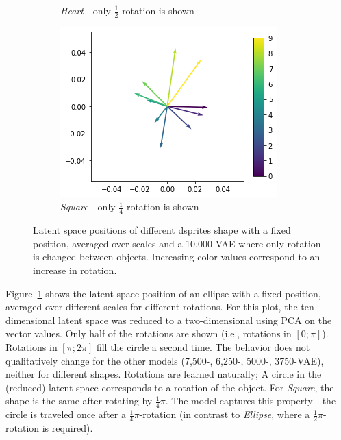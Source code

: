 \begin{figure}
\begin{subfigure}{.3\textwidth}
        \caption{\textit{Heart} - only $\frac{1}{2}$ rotation is shown}
    \end{subfigure}
    \hfill
    \begin{subfigure}{.3\textwidth}
        \includegraphics[width=\textwidth]{images/latent_space_traversals/vae_dsprites_orientation_latent_space_square.png}
        \caption{\textit{Square} - only $\frac{1}{4}$ rotation is shown}
    \end{subfigure}
    \caption[10,000-\ac{VAE} - Rotation latent space]{Latent space positions of different dsprites shape with a fixed position, averaged over scales and a 10,000-\ac{VAE} where only rotation is changed between objects. Increasing color values correspond to an increase in rotation. }
    \label{fig:vae_dsprites_rotation_latent_space_vae_10000}
\end{figure}

Figure~\ref{fig:vae_dsprites_rotation_latent_space_vae_10000} shows the latent space position of an ellipse with a fixed position, averaged over different scales for different rotations.
For this plot, the ten-dimensional latent space was reduced to a two-dimensional using \ac{PCA} on the vector values.
Only half of the rotations are shown (i.e., rotations in $[0;\pi]$).
Rotations in $[\pi; 2\pi]$ fill the circle a second time.
The behavior does not qualitatively change for the other models (7,500-, 6,250-, 5000-, 3750-\ac{VAE}), neither for different shapes.
Rotations are learned naturally;
A circle in the (reduced) latent space corresponds to a rotation of the object.
For \textit{Square}, the shape is the same after rotating by $\frac{1}{4}\pi$.
The model captures this property - the circle is traveled once after a $\frac{1}{4}\pi$-rotation (in contrast to \textit{Ellipse}, where a $\frac{1}{2}\pi$-rotation is required).

